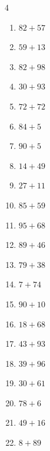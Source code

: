 \begin{multicols}{4}
\begin{enumerate}
  \item $82+57$
        \phantom{$=139$}

  \item $59+13$
        \phantom{$=72$}

  \item $82+98$
        \phantom{$=180$}

  \item $30+93$
        \phantom{$=123$}

  \item $72+72$
        \phantom{$=144$}

  \item $84+5$
        \phantom{$=89$}

  \item $90+5$
        \phantom{$=95$}

  \item $14+49$
        \phantom{$=63$}

  \item $27+11$
        \phantom{$=38$}

  \item $85+59$
        \phantom{$=144$}

  \item $95+68$
        \phantom{$=163$}

  \item $89+46$
        \phantom{$=135$}

  \item $79+38$
        \phantom{$=117$}

  \item $7+74$
        \phantom{$=81$}

  \item $90+10$
        \phantom{$=100$}

  \item $18+68$
        \phantom{$=86$}

  \item $43+93$
        \phantom{$=136$}

  \item $39+96$
        \phantom{$=135$}

  \item $30+61$
        \phantom{$=91$}

  \item $78+6$
        \phantom{$=84$}

  \item $49+16$
        \phantom{$=65$}

  \item $8+89$
        \phantom{$=97$}


\end{enumerate}
\end{multicols}
